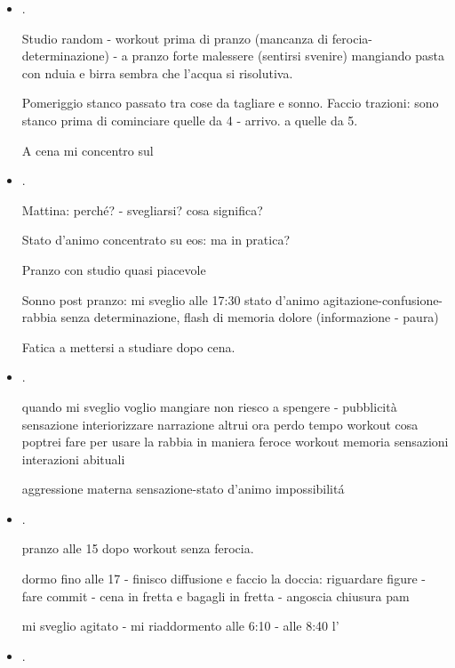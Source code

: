 \begin{itemize}
\item {}.

Studio random - workout prima di pranzo (mancanza di ferocia-determinazione) - a pranzo forte malessere (sentirsi svenire) mangiando pasta con nduia e birra sembra che l'acqua si risolutiva.

Pomeriggio stanco passato tra cose da tagliare e sonno. Faccio trazioni: sono stanco prima di cominciare quelle da 4 - arrivo. a quelle da 5.

A cena mi concentro sul 

\item {}.

Mattina: perch\'e? - svegliarsi? cosa significa?

Stato d'animo concentrato su eos: ma in pratica?

Pranzo con studio quasi piacevole

Sonno post pranzo: mi sveglio alle 17:30 stato d'animo agitazione-confusione-rabbia senza determinazione, flash di memoria dolore (informazione - paura)

Fatica a mettersi a studiare dopo cena.

\item {}.

quando mi sveglio voglio mangiare
non riesco a spengere - pubblicità 
sensazione interiorizzare narrazione altrui
ora perdo tempo
workout cosa poptrei fare per usare la rabbia in maniera feroce
workout memoria sensazioni interazioni abituali

aggressione materna sensazione-stato d'animo impossibilit\'a

\item {}.


pranzo alle 15 dopo workout senza ferocia.

dormo fino alle 17 - finisco diffusione e faccio la doccia: riguardare figure - fare commit - cena in fretta e bagagli in fretta - angoscia chiusura pam

mi sveglio agitato - mi riaddormento alle 6:10 - alle 8:40 l'

\item {}.


\end{itemize}
